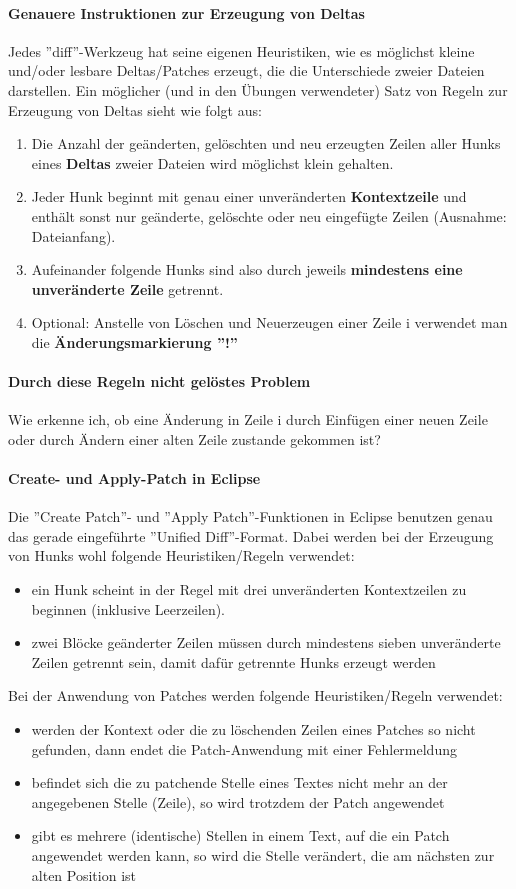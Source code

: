 \paragraph{Genauere Instruktionen zur Erzeugung von Deltas}
Jedes ''diff''-Werkzeug hat seine eigenen Heuristiken, wie es möglichst kleine und/oder lesbare Deltas/Patches erzeugt, die die Unterschiede zweier Dateien darstellen. Ein möglicher (und in den Übungen verwendeter) Satz von Regeln zur Erzeugung von Deltas sieht wie folgt aus:
\begin{enumerate}
	\item Die Anzahl der geänderten, gelöschten und neu erzeugten Zeilen aller Hunks eines \textbf{Deltas} zweier Dateien wird möglichst klein gehalten.
	\item Jeder Hunk beginnt mit genau einer unveränderten \textbf{Kontextzeile} und enthält sonst nur geänderte, gelöschte oder neu eingefügte Zeilen (Ausnahme: Dateianfang).
	\item Aufeinander folgende Hunks sind also durch jeweils \textbf{mindestens eine unveränderte Zeile} getrennt.
	\item Optional: Anstelle von Löschen und Neuerzeugen einer Zeile i verwendet man die 
	\textbf{Änderungsmarkierung ''!''}
\end{enumerate}
\paragraph{Durch diese Regeln nicht gelöstes Problem}
Wie erkenne ich, ob eine Änderung in Zeile i durch Einfügen einer neuen Zeile oder durch Ändern einer alten Zeile zustande gekommen ist?
\paragraph{Create- und Apply-Patch in Eclipse}
Die ''Create Patch''- und ''Apply Patch''-Funktionen in Eclipse benutzen genau das gerade eingeführte ''Unified Diff''-Format. Dabei werden bei der Erzeugung von Hunks wohl folgende Heuristiken/Regeln verwendet:
\begin{itemize}
	\item ein Hunk scheint in der Regel mit drei unveränderten Kontextzeilen zu beginnen (inklusive Leerzeilen).
	\item zwei Blöcke geänderter Zeilen müssen durch mindestens sieben unveränderte Zeilen getrennt sein, damit dafür getrennte Hunks erzeugt werden
\end{itemize}
Bei der Anwendung von Patches werden folgende Heuristiken/Regeln verwendet:
\begin{itemize}
	\item werden der Kontext oder die zu löschenden Zeilen eines Patches so nicht gefunden, dann endet die Patch-Anwendung mit einer Fehlermeldung
	\item befindet sich die zu patchende Stelle eines Textes nicht mehr an der angegebenen Stelle (Zeile), so wird trotzdem der Patch angewendet
	\item gibt es mehrere (identische) Stellen in einem Text, auf die ein Patch angewendet werden kann, so wird die Stelle verändert, die am nächsten zur alten Position ist
\end{itemize}
